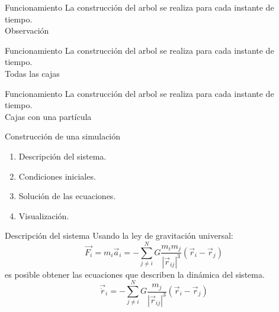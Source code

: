 \documentclass{beamer}
\begin{document}
\begin{frame}{Funcionamiento}
	La construcci\'on del arbol se realiza para cada instante de tiempo.
	\centering
	\\
	Observaci\'on
\end{frame}
\begin{frame}{Funcionamiento}
	La construcci\'on del arbol se realiza para cada instante de tiempo.
	\centering
	\\
	Todas las cajas
\end{frame}
\begin{frame}{Funcionamiento}
	La construcci\'on del arbol se realiza para cada instante de tiempo.
	\centering
	\\
	Cajas con una part\'icula
\end{frame}
\begin{frame}{Construcci\'on de una simulaci\'on}
	\begin{enumerate}
		\item Descripci\'on del sistema. \pause
		\item Condiciones iniciales. \pause
		\item Soluci\'on de las ecuaciones. \pause
		\item Visualizaci\'on.
	\end{enumerate}
\end{frame}
\begin{frame}{Descripci\'on del sistema}
	Usando la ley de gravitaci\'on universal:
	\begin{equation}
		\vec{F_i} = m_i\vec{a}_i = - \sum\limits_{j\neq i}^N G\dfrac{m_im_j}{|\vec{r}_{ij}|^3}\left(\vec{r}_i - \vec{r}_j\right)
	\end{equation}\pause
	es posible obtener las ecuaciones que describen la din\'amica del sistema.\pause
	\begin{equation}
		\vec{\ddot{r}}_i = - \sum\limits_{j\neq i}^N G\dfrac{m_j}{|\vec{r}_{ij}|^3}\left(\vec{r}_i - \vec{r}_j\right)
	\end{equation}
\end{frame}
\end{document}
